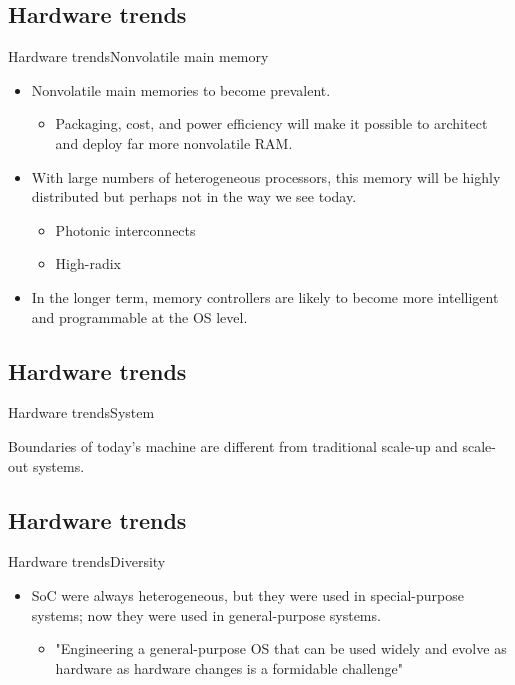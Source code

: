 \documentclass[10pt]{beamer}
\begin{document}
\subsection{Hardware trends}
\begin{frame}{Hardware trends}{Nonvolatile main memory}
  \begin{itemize}
    \item Nonvolatile main memories to become prevalent.
    \begin{itemize}
      \item Packaging, cost, and power efficiency will make it possible to
            architect and deploy far more nonvolatile RAM.
    \end{itemize}
    \item With large numbers of heterogeneous processors, this memory will be
          highly distributed but perhaps not in the way we see today.
      \begin{itemize}
        \item Photonic interconnects
        \item High-radix
      \end{itemize}
    \item In the longer term, memory controllers are likely to become more
          intelligent and programmable at the OS level.
   \end{itemize}
\end{frame}

\subsection{Hardware trends}
\begin{frame}{Hardware trends}{System}
  \begin{block}{}
    Boundaries of today's machine are different from traditional scale-up and
    scale-out systems.
   \end{block}
\end{frame}

\subsection{Hardware trends}
\begin{frame}{Hardware trends}{Diversity}
  \begin{itemize}
    \item SoC were always heterogeneous, but they were used in special-purpose
          systems; now they were used in general-purpose systems.
      \begin{itemize}
        \item "Engineering a general-purpose OS that can be used widely and
             evolve as hardware as hardware changes is a formidable challenge"
      \end{itemize}
   \end{itemize}
\end{frame}
\end{document}
